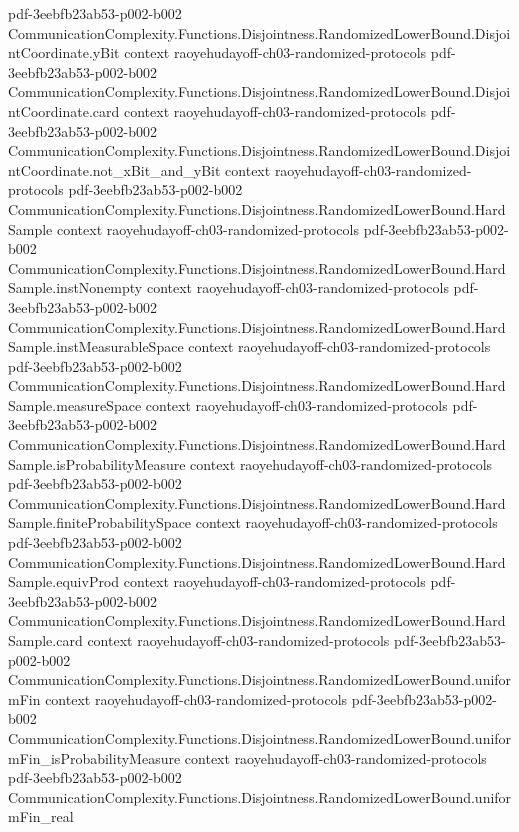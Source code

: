 \begin{theorem}
  {pdf-3eebfb23ab53-p002-b002}
\proofstep
  {CommunicationComplexity.Functions.Disjointness.RandomizedLowerBound.DisjointCoordinate.yBit}
  {context}
  {raoyehudayoff-ch03-randomized-protocols}
  {pdf-3eebfb23ab53-p002-b002}
\proofstep
  {CommunicationComplexity.Functions.Disjointness.RandomizedLowerBound.DisjointCoordinate.card}
  {context}
  {raoyehudayoff-ch03-randomized-protocols}
  {pdf-3eebfb23ab53-p002-b002}
\proofstep
  {CommunicationComplexity.Functions.Disjointness.RandomizedLowerBound.DisjointCoordinate.not_xBit_and_yBit}
  {context}
  {raoyehudayoff-ch03-randomized-protocols}
  {pdf-3eebfb23ab53-p002-b002}
\proofstep
  {CommunicationComplexity.Functions.Disjointness.RandomizedLowerBound.HardSample}
  {context}
  {raoyehudayoff-ch03-randomized-protocols}
  {pdf-3eebfb23ab53-p002-b002}
\proofstep
  {CommunicationComplexity.Functions.Disjointness.RandomizedLowerBound.HardSample.instNonempty}
  {context}
  {raoyehudayoff-ch03-randomized-protocols}
  {pdf-3eebfb23ab53-p002-b002}
\proofstep
  {CommunicationComplexity.Functions.Disjointness.RandomizedLowerBound.HardSample.instMeasurableSpace}
  {context}
  {raoyehudayoff-ch03-randomized-protocols}
  {pdf-3eebfb23ab53-p002-b002}
\proofstep
  {CommunicationComplexity.Functions.Disjointness.RandomizedLowerBound.HardSample.measureSpace}
  {context}
  {raoyehudayoff-ch03-randomized-protocols}
  {pdf-3eebfb23ab53-p002-b002}
\proofstep
  {CommunicationComplexity.Functions.Disjointness.RandomizedLowerBound.HardSample.isProbabilityMeasure}
  {context}
  {raoyehudayoff-ch03-randomized-protocols}
  {pdf-3eebfb23ab53-p002-b002}
\proofstep
  {CommunicationComplexity.Functions.Disjointness.RandomizedLowerBound.HardSample.finiteProbabilitySpace}
  {context}
  {raoyehudayoff-ch03-randomized-protocols}
  {pdf-3eebfb23ab53-p002-b002}
\proofstep
  {CommunicationComplexity.Functions.Disjointness.RandomizedLowerBound.HardSample.equivProd}
  {context}
  {raoyehudayoff-ch03-randomized-protocols}
  {pdf-3eebfb23ab53-p002-b002}
\proofstep
  {CommunicationComplexity.Functions.Disjointness.RandomizedLowerBound.HardSample.card}
  {context}
  {raoyehudayoff-ch03-randomized-protocols}
  {pdf-3eebfb23ab53-p002-b002}
\proofstep
  {CommunicationComplexity.Functions.Disjointness.RandomizedLowerBound.uniformFin}
  {context}
  {raoyehudayoff-ch03-randomized-protocols}
  {pdf-3eebfb23ab53-p002-b002}
\proofstep
  {CommunicationComplexity.Functions.Disjointness.RandomizedLowerBound.uniformFin_isProbabilityMeasure}
  {context}
  {raoyehudayoff-ch03-randomized-protocols}
  {pdf-3eebfb23ab53-p002-b002}
\proofstep
  {CommunicationComplexity.Functions.Disjointness.RandomizedLowerBound.uniformFin_real}

\end{theorem}
